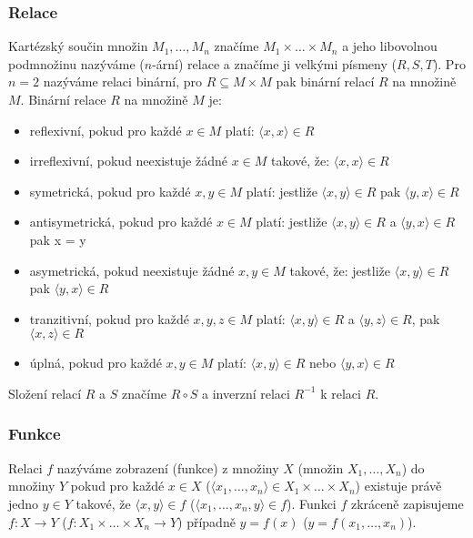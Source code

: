 \documentclass[a4paper,10pt]{article}
\begin{document}
\subsubsection*{Relace}
Kartézský součin množin $M_1, \dots, M_n$ značíme $M_1 \times \dots \times M_n$ a jeho libovolnou podmnožinu nazýváme ($n$-ární) relace a značíme ji velkými písmeny ($R, S, T$). Pro $n=2$ nazýváme relaci binární, pro $R \subseteq M \times M$ pak binární relací $R$ na množině $M$. Binární relace $R$ na množině $M$ je:
\begin{itemize}
 \item reflexivní, pokud pro každé $x \in M$ platí: $ \langle x, x \rangle \in R $
 \item irreflexivní, pokud neexistuje žádné $x \in M$ takové, že: $ \langle x, x \rangle \in R $
 \item symetrická, pokud pro každé $x, y \in M$ platí: jestliže $ \langle x, y \rangle \in R$ pak $\langle y, x \rangle \in R$
 \item antisymetrická, pokud pro každé $x \in M$ platí: jestliže $ \langle x, y \rangle \in R$ a $\langle y, x \rangle \in R$ pak x = y 
 \item asymetrická, pokud neexistuje žádné $x, y \in M$ takové, že: jestliže $ \langle x, y \rangle \in R$ pak $\langle y, x \rangle \in R$
 \item tranzitivní, pokud pro každé $x, y, z \in M$ platí: $ \langle x, y \rangle \in R$ a $\langle y, z \rangle \in R$,  pak $\langle x, z \rangle \in R$
 \item úplná, pokud pro každé $x, y \in M$ platí: $ \langle x, y \rangle \in R$ nebo $\langle y, x \rangle \in R$
\end{itemize}


Složení relací $R$ a $S$ značíme $R \circ S$ a inverzní relaci $R^{-1}$ k relaci $R$.

\subsubsection*{Funkce}
Relaci $f$ nazýváme zobrazení (funkce) z množiny $X$ (množin $X_1, \dots, X_n$) do množiny $Y$ pokud pro každé $x \in X$ ($\langle x_1, \dots, x_n \rangle \in X_1 \times \dots \times X_n$) existuje právě jedno $y \in Y$ takové, že $\langle x, y \rangle \in f$ ($\langle x_1, \dots, x_n, y \rangle \in f$). Funkci $f$ zkráceně zapisujeme $f: X \rightarrow Y$ ($f: X_1 \times \dots \times X_n \rightarrow Y$) případně $y = f(x)$ ($y = f(x_1, \dots, x_n)$).
\end{document}
